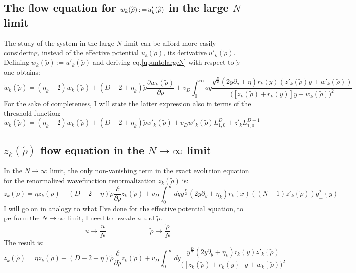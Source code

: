 \subsection{The flow equation for $w_k(\widetilde{\rho}) \operatorname{:=} u'_k(\widetilde{\rho})$ in the large $N$ limit}
The study of the system in the large $N$ limit can be afford more easily considering, instead of the effective potential $u_k(\widetilde{\rho})$, its derivative $u'_k(\widetilde{\rho})$. Defining $w_k(\widetilde{\rho}) := u'_k(\widetilde{\rho})$ and deriving eq.\eqref{upuntolargeN} with respect to $\widetilde{\rho}$ one obtains:
\begin{equation}\label{wpuntolargeN}
 \dot{w}_k(\widetilde{\rho}) = (\eta_k -2 )w_k(\widetilde{\rho}) + (D-2 +\eta_k)\widetilde{\rho}\frac{\partial w_k(\widetilde{\rho})}{\partial \widetilde{\rho}} + v_D\int_0^\infty dy \frac{y^{\frac{D}{2}}  (2y\partial_y + \eta) r_k(y)(z'_k(\widetilde{\rho})y + w'_k(\widetilde{\rho}))}{\big([z_k(\widetilde{\rho}) + r_k(y)]y + w_k(\widetilde{\rho})\big)^2}
\end{equation}
For the sake of completeness, I will state the latter expression also in terms of the threshold function:
\begin{equation}
 \dot{w}_k(\widetilde{\rho}) = (\eta_k -2 )w_k(\widetilde{\rho}) + (D-2 +\eta_k)\widetilde{\rho}w'_k(\widetilde{\rho}) + v_Dw'_k(\widetilde{\rho})L^D_{1,0} + z'_kL^{D+1}_{1,0}
\end{equation}

\subsection{$z_k(\widetilde{\rho})$ flow equation in the $N \to\infty$ limit}
In the $N \to \infty$ limit, the only non-vanishing term in the exact evolution equation for the renormalized
wavefunction renormalization $z_k(\widetilde{\rho})$ is:
\begin{equation}
\dot{z}_k(\widetilde{\rho}) =\eta z_k(\widetilde{\rho}) + (D-2+\eta)\widetilde{\rho}\frac{\partial}{\partial \widetilde{\rho}} z_k(\widetilde{\rho}) + v_D\int_0^\infty dy y^{\frac{D}{2}}  (2y\partial_y + \eta_k) r_k(x)\left((N-1)z'_k(\widetilde{\rho})\right)g^2_\perp(y) 
\end{equation}
I will go on in analogy to what I've done for the effective potential equation, to perform the $N \to \infty$ limit, I need to rescale $u$ and $\widetilde{\rho}$:
$$u \to \frac{u}{N} \ \ \ \ \ \ \ \ \ \  \ \ \ \ \ \  \ \ \ \ \ \ \  \ \ \ \ \ \   \widetilde{\rho} \to \frac{\widetilde{\rho}}{N} $$
The result is:
\begin{equation}\label{zpuntolargeN}
\dot{z}_k(\widetilde{\rho}) =\eta z_k(\widetilde{\rho}) + (D-2+\eta)\widetilde{\rho}\frac{\partial}{\partial \widetilde{\rho}} z_k(\widetilde{\rho})  + v_D\int_0^\infty dy \frac{y^{\frac{D}{2}}  (2y\partial_y + \eta_k) r_k(y)z'_k(\widetilde{\rho})}{\big([z_k(\widetilde{\rho}) + r_k(y)]y + w_k(\widetilde{\rho})\big)^2}
\end{equation}
